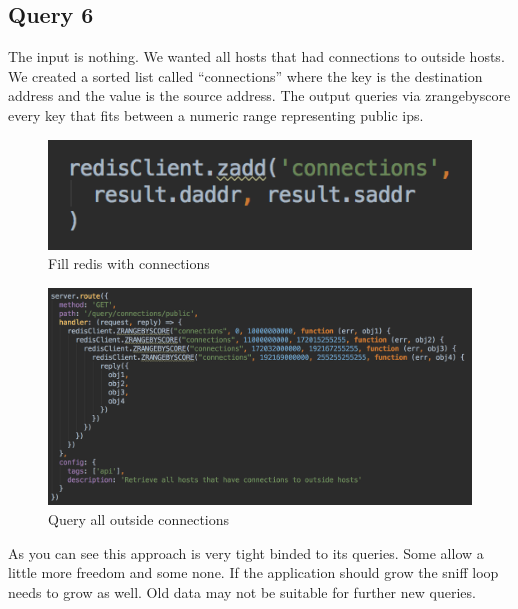 \subsection{Query 6}
The input is nothing. We wanted all hosts that had connections to outside hosts. We created a sorted list called “connections” where the key is the destination address and the value is the source address. The output queries via zrangebyscore every key that fits between a numeric range representing public ips.

  \begin{figure}[htb!]
	\centerline{\includegraphics[width=1.0\textwidth]{resources/solution2-12.png}}
	\caption{Fill redis with connections}
	\label{query6}
\end{figure}

\begin{figure}[htb!]
	\centerline{\includegraphics[width=1.0\textwidth]{resources/solution2-13.png}}
	\caption{Query all outside connections}
	\label{query66}
\end{figure}

As you can see this approach is very tight binded to its queries. Some allow a little more freedom and some none. If the application should grow the sniff loop needs to grow as well. Old data may not be suitable for further new queries.


